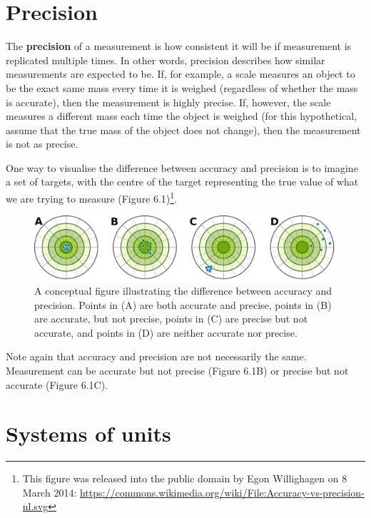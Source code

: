 \documentclass[
  openany]{krantz}
\begin{document}
\hypertarget{precision}{%
\section{Precision}\label{precision}}

The \textbf{precision} of a measurement is how consistent it will be if measurement is replicated multiple times.
In other words, precision describes how similar measurements are expected to be.
If, for example, a scale measures an object to be the exact same mass every time it is weighed (regardless of whether the mass is accurate), then the measurement is highly precise.
If, however, the scale measures a different mass each time the object is weighed (for this hypothetical, assume that the true mass of the object does not change), then the measurement is not as precise.

One way to visualise the difference between accuracy and precision is to imagine a set of targets, with the centre of the target representing the true value of what we are trying to measure (Figure 6.1)\footnote{This figure was released into the public domain by Egon Willighagen on 8 March 2014: \url{https://commons.wikimedia.org/wiki/File:Accuracy-vs-precision-nl.svg}}.

\begin{figure}
\includegraphics[width=1\linewidth]{img/accuracy_vs_precision} \caption{A conceptual figure illustrating the difference between accuracy and precision. Points in (A) are both accurate and precise, points in (B) are accurate, but not precise, points in (C) are precise but not accurate, and points in (D) are neither accurate nor precise.}\label{fig:unnamed-chunk-22}
\end{figure}

Note again that accuracy and precision are not necessarily the same.
Measurement can be accurate but not precise (Figure 6.1B) or precise but not accurate (Figure 6.1C).

\hypertarget{systems-of-units}{%
\section{Systems of units}\label{systems-of-units}}
\end{document}
